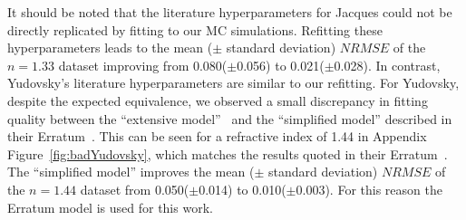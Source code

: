 It should be noted that the literature hyperparameters for Jacques could not be
directly
replicated by fitting to our MC simulations. 
Refitting these hyperparameters leads to the mean ($\pm$ standard deviation) $NRMSE$ of the $n=1.33$ dataset improving from 0.080($\pm$0.056) to 0.021($\pm$0.028). 
In contrast, Yudovsky's literature hyperparameters are similar to our refitting.
For Yudovsky, despite the expected equivalence, we observed a small discrepancy in fitting quality between the ``extensive model''~\citep{Yudovsky2009} and the ``simplified model'' described in their Erratum~\citep{Yudovsky2015}.
This can be seen for a refractive index of 1.44 in Appendix Figure~\ref{fig:badYudovsky}, which matches the results quoted in their Erratum~\citep{Yudovsky2015}.
The ``simplified model'' improves the mean ($\pm$ standard deviation) $NRMSE$ of the $n=1.44$ dataset from 0.050($\pm$0.014) to 0.010($\pm$0.003).
For this reason the Erratum model is used for this work. 

